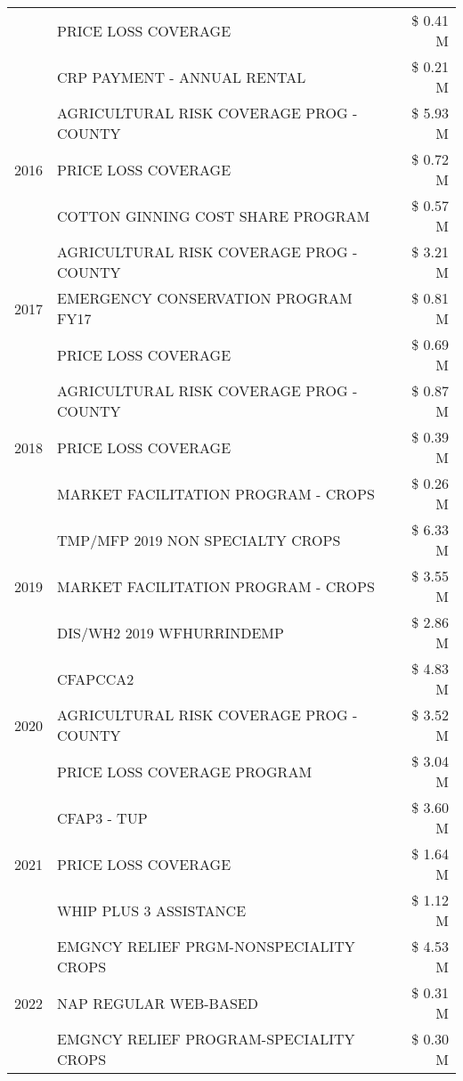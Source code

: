 \begin{tabular}{llr}
 & PRICE LOSS COVERAGE & \$ 0.41 M \\
 & CRP PAYMENT - ANNUAL RENTAL & \$ 0.21 M \\
\cline{1-3}
\multirow[t]{3}{*}{2016} & AGRICULTURAL RISK COVERAGE PROG - COUNTY & \$ 5.93 M \\
 & PRICE LOSS COVERAGE & \$ 0.72 M \\
 & COTTON GINNING COST SHARE PROGRAM & \$ 0.57 M \\
\cline{1-3}
\multirow[t]{3}{*}{2017} & AGRICULTURAL RISK COVERAGE PROG - COUNTY & \$ 3.21 M \\
 & EMERGENCY CONSERVATION PROGRAM FY17 & \$ 0.81 M \\
 & PRICE LOSS COVERAGE & \$ 0.69 M \\
\cline{1-3}
\multirow[t]{3}{*}{2018} & AGRICULTURAL RISK COVERAGE PROG - COUNTY & \$ 0.87 M \\
 & PRICE LOSS COVERAGE & \$ 0.39 M \\
 & MARKET FACILITATION PROGRAM - CROPS & \$ 0.26 M \\
\cline{1-3}
\multirow[t]{3}{*}{2019} & TMP/MFP 2019 NON SPECIALTY CROPS & \$ 6.33 M \\
 & MARKET FACILITATION PROGRAM - CROPS & \$ 3.55 M \\
 & DIS/WH2 2019 WFHURRINDEMP & \$ 2.86 M \\
\cline{1-3}
\multirow[t]{3}{*}{2020} & CFAPCCA2 & \$ 4.83 M \\
 & AGRICULTURAL RISK COVERAGE PROG - COUNTY & \$ 3.52 M \\
 & PRICE LOSS COVERAGE PROGRAM & \$ 3.04 M \\
\cline{1-3}
\multirow[t]{3}{*}{2021} & CFAP3 - TUP & \$ 3.60 M \\
 & PRICE LOSS COVERAGE & \$ 1.64 M \\
 & WHIP PLUS 3 ASSISTANCE & \$ 1.12 M \\
\cline{1-3}
\multirow[t]{3}{*}{2022} & EMGNCY RELIEF PRGM-NONSPECIALITY CROPS & \$ 4.53 M \\
 & NAP REGULAR WEB-BASED & \$ 0.31 M \\
 & EMGNCY RELIEF PROGRAM-SPECIALITY CROPS & \$ 0.30 M \\
\cline{1-3}
\bottomrule
\end{tabular}
